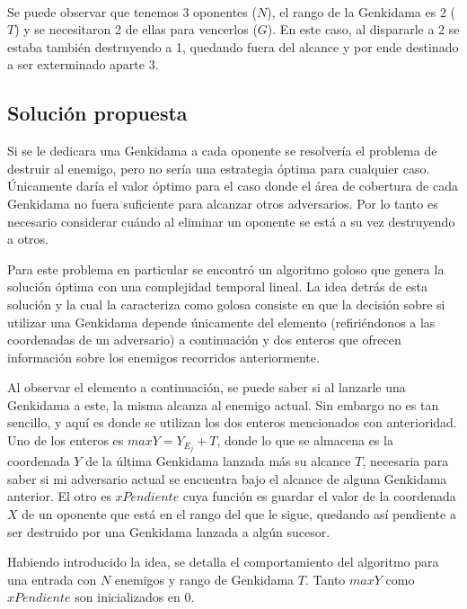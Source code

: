 	~

	Se puede observar que tenemos 3 oponentes ($N$), el rango de la
	Genkidama es 2 ($T$) y se necesitaron 2 de ellas para vencerlos ($G$). En este caso, al
	dispararle a 2 se estaba también destruyendo a 1, quedando fuera del alcance
	y por ende destinado a ser exterminado aparte 3.

    \subsection{Solución propuesta}

	Si se le dedicara una Genkidama a cada oponente se resolvería el problema de
	destruir al enemigo, pero no sería una estrategia óptima para cualquier
	caso. Únicamente daría el valor óptimo para el caso donde el área de cobertura de cada
	Genkidama no fuera suficiente para alcanzar otros adversarios. Por lo tanto
	es necesario considerar cuándo al eliminar un oponente se está a su vez
	destruyendo a otros.

	Para este problema en particular se encontró un algoritmo goloso que genera
	la solución óptima con una complejidad temporal lineal. La idea detrás de
	esta solución y la cual la caracteriza como golosa consiste en que la
	decisión sobre si utilizar una Genkidama depende únicamente del
	elemento (refiriéndonos a las coordenadas de un adversario) a continuación y dos
	enteros que ofrecen información sobre los enemigos recorridos anteriormente.

	Al observar el elemento a continuación, se puede saber si al lanzarle una
	Genkidama a este, la misma alcanza al enemigo actual. Sin embargo no
	es tan sencillo, y aquí es donde se utilizan los dos enteros mencionados con
	anterioridad. Uno de los enteros es $maxY = Y_{E_j} + T$, donde lo que se
	almacena es la coordenada $Y$ de la última Genkidama lanzada más su alcance
	$T$, necesaria para saber si mi adversario actual se encuentra bajo el
	alcance de alguna Genkidama anterior. El otro es $xPendiente$ cuya función
	es guardar el valor de la coordenada $X$ de un oponente que está en el
	rango del que le sigue, quedando así pendiente a ser destruido por una
	Genkidama lanzada a algún sucesor.

	Habiendo introducido la idea, se detalla el comportamiento del algoritmo para
	una entrada con $N$ enemigos y rango de Genkidama $T$. Tanto $maxY$ como
	$xPendiente$ son inicializados en 0.

